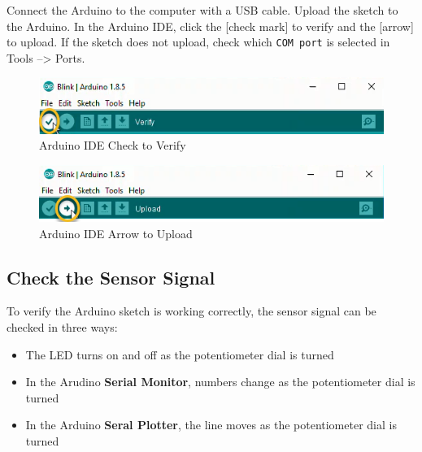 \documentclass{book}
\makeatletter
\def\maxwidth{\ifdim\Gin@nat@width>\linewidth\linewidth
    \else\Gin@nat@width\fi}
\let\Oldincludegraphics\includegraphics
\renewcommand{\includegraphics}[1]{\Oldincludegraphics[width=.8\maxwidth]{#1}}
\providecommand{\tightlist}{%
      \setlength{\itemsep}{0pt}\setlength{\parskip}{0pt}}
\makeatother
\begin{document}
    
        Connect the Arduino to the computer with a USB cable. Upload the sketch
to the Arduino. In the Arduino IDE, click the {[}check mark{]} to verify
and the {[}arrow{]} to upload. If the sketch does not upload, check
which \lstinline!COM port! is selected in Tools --\textgreater{} Ports.

\begin{figure}
\centering
\includegraphics{images/Check_to_Verify.png}
\caption{Arduino IDE Check to Verify}
\end{figure}

\begin{figure}
\centering
\includegraphics{images/Arrow_to_Upload.png}
\caption{Arduino IDE Arrow to Upload}
\end{figure}
    




    
        \subsection{Check the Sensor Signal}\label{check-the-sensor-signal}
    




    
        To verify the Arduino sketch is working correctly, the sensor signal can
be checked in three ways:

\begin{itemize}
\tightlist
\item
  The LED turns on and off as the potentiometer dial is turned
\item
  In the Arudino \textbf{Serial Monitor}, numbers change as the
  potentiometer dial is turned
\item
  In the Arduino \textbf{Seral Plotter}, the line moves as the
  potentiometer dial is turned
\end{itemize}
    
\end{document}
